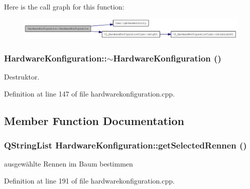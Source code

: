Here is the call graph for this function:\nopagebreak
\begin{figure}[H]
\begin{center}
\leavevmode
\includegraphics[width=369pt]{class_hardware_konfiguration_2872e94ce344a468b351bd1e00353760_cgraph}
\end{center}
\end{figure}
\hypertarget{class_hardware_konfiguration_309954982d345e65f8ac5fa6c9489ce5}{
\subsubsection[$\sim$HardwareKonfiguration]{\setlength{\rightskip}{0pt plus 5cm}HardwareKonfiguration::$\sim$HardwareKonfiguration ()}}
\label{class_hardware_konfiguration_309954982d345e65f8ac5fa6c9489ce5}


Destruktor. 



Definition at line 147 of file hardwarekonfiguration.cpp.

\subsection{Member Function Documentation}
\hypertarget{class_hardware_konfiguration_dae436cb5061cb83f6b8fcd823ad79ae}{
\subsubsection[getSelectedRennen]{\setlength{\rightskip}{0pt plus 5cm}QStringList HardwareKonfiguration::getSelectedRennen ()}}
\label{class_hardware_konfiguration_dae436cb5061cb83f6b8fcd823ad79ae}


ausgewählte Rennen im Baum bestimmen 



Definition at line 191 of file hardwarekonfiguration.cpp.


